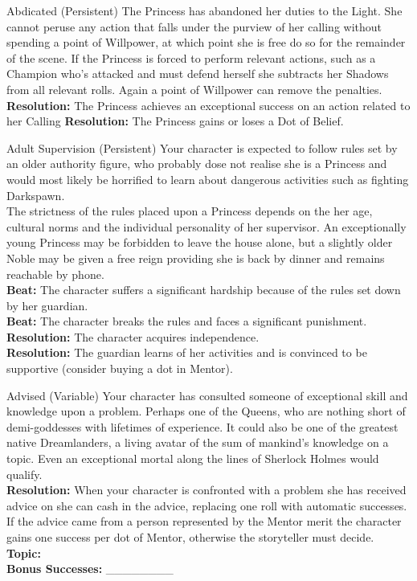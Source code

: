 \documentclass[10pt, frontgrid, backgrid]{flacards}
\begin{document}
\Cond
{Abdicated (Persistent)}
{The Princess has abandoned her duties to the Light. She cannot peruse any action that falls under the purview of her calling without spending a point of Willpower, at which point she is free do so for the remainder of the scene. If the Princess is forced to perform relevant actions, such as a Champion who's attacked and must defend herself she subtracts her Shadows from all relevant rolls. Again a point of Willpower can remove the penalties.
\textbf{Resolution:} The Princess achieves an exceptional success on an action related to her Calling
\textbf{Resolution:} The Princess gains or loses a Dot of Belief. 
}


\Cond
{Adult Supervision (Persistent)}
{Your character is expected to follow rules set by an older authority figure, who probably dose not realise she is a Princess and would most likely be horrified to learn about dangerous activities such as fighting Darkspawn. \\

The strictness of the rules placed upon a Princess depends on the her age, cultural norms and the individual personality of her supervisor. An exceptionally young Princess may be forbidden to leave the house alone, but a slightly older Noble may be given a free reign providing she is back by dinner and remains reachable by phone.\\
\textbf{Beat:} The character suffers a significant hardship because of the rules set down by her guardian.\\
\textbf{Beat:} The character breaks the rules and faces a significant punishment.\\
\textbf{Resolution:} The character acquires independence.\\
\textbf{Resolution:} The guardian learns of her activities and is convinced to be supportive (consider buying a dot in Mentor).
}

\Cond
{Advised (Variable)}
{Your character has consulted someone of exceptional skill and knowledge upon a problem. Perhaps one of the Queens, who are nothing short of demi-goddesses with lifetimes of experience. It could also be one of the greatest native Dreamlanders, a living avatar of the sum of mankind's knowledge on a topic. Even an exceptional mortal along the lines of Sherlock Holmes would qualify.\\
\textbf{Resolution:} When your character is confronted with a problem she has received advice on she can cash in the advice, replacing one roll with automatic successes. If the advice came from a person represented by the Mentor merit the character gains one success per dot of Mentor, otherwise the storyteller must decide.\\
\textbf{Topic:} \fillunderline \\
\textbf{Bonus Successes:} \_\_\_\_\_\_\_\_
}
\end{document}
